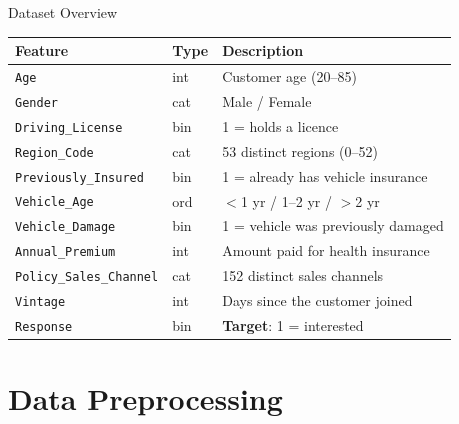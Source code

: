 \documentclass[aspectratio=169, 10pt]{beamer}
\begin{document}
\begin{frame}{Dataset Overview}
  \begin{table}[h]
    \centering
    \small
    \begin{tabular}{@{}llp{6.5cm}@{}}
      \toprule
      \textbf{Feature} & \textbf{Type} & \textbf{Description} \\
      \midrule
      \texttt{Age}                  & int   & Customer age (20--85) \\
      \texttt{Gender}               & cat   & Male / Female \\
      \texttt{Driving\_License}     & bin   & 1 = holds a licence \\
      \texttt{Region\_Code}         & cat   & 53 distinct regions (0--52) \\
      \texttt{Previously\_Insured}  & bin   & 1 = already has vehicle insurance \\
      \texttt{Vehicle\_Age}         & ord   & $<$1 yr / 1--2 yr / $>$2 yr \\
      \texttt{Vehicle\_Damage}      & bin   & 1 = vehicle was previously damaged \\
      \texttt{Annual\_Premium}      & int   & Amount paid for health insurance \\
      \texttt{Policy\_Sales\_Channel} & cat & 152 distinct sales channels \\
      \texttt{Vintage}              & int   & Days since the customer joined \\
      \texttt{Response}             & bin   & \textbf{Target}: 1 = interested \\
      \bottomrule
    \end{tabular}
  \end{table}
\end{frame}

\section{Data Preprocessing}
\end{document}
